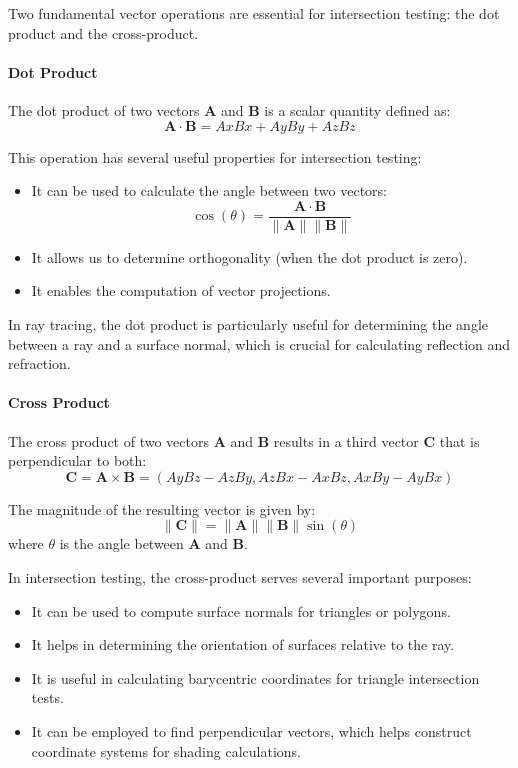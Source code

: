 \documentclass[12pt]{article}
\begin{document}
Two fundamental vector operations are essential for intersection testing: the dot product and the cross-product.

\paragraph{Dot Product}
The dot product of two vectors \(\mathbf{A}\) and \(\mathbf{B}\) is a scalar quantity defined as:
\[
    \mathbf{A} \cdot \mathbf{B} = Ax Bx + Ay By + Az Bz
\]

This operation has several useful properties for intersection testing:

\begin{itemize}
    \item It can be used to calculate the angle between two vectors:
          \[
              \cos(\theta) = \frac{\mathbf{A} \cdot \mathbf{B}}{\|\mathbf{A}\| \|\mathbf{B}\|}
          \]
    \item It allows us to determine orthogonality (when the dot product is zero).
    \item It enables the computation of vector projections.
\end{itemize}

In ray tracing, the dot product is particularly useful for determining the angle between a ray and a surface normal, which is crucial for calculating reflection and refraction.

\paragraph{Cross Product}
The cross product of two vectors \(\mathbf{A}\) and \(\mathbf{B}\) results in a third vector \(\mathbf{C}\) that is perpendicular to both:
\[
    \mathbf{C} = \mathbf{A} \times \mathbf{B} = \left( Ay Bz - Az By, Az Bx - Ax Bz, Ax By - Ay Bx \right)
\]

The magnitude of the resulting vector is given by:
\[
    \|\mathbf{C}\| = \|\mathbf{A}\| \|\mathbf{B}\| \sin(\theta)
\]
where \(\theta\) is the angle between \(\mathbf{A}\) and \(\mathbf{B}\).

In intersection testing, the cross-product serves several important purposes:

\begin{itemize}
    \item It can be used to compute surface normals for triangles or polygons.
    \item It helps in determining the orientation of surfaces relative to the ray.
    \item It is useful in calculating barycentric coordinates for triangle intersection tests.
    \item It can be employed to find perpendicular vectors, which helps construct coordinate systems for shading calculations.
\end{itemize}
\end{document}

